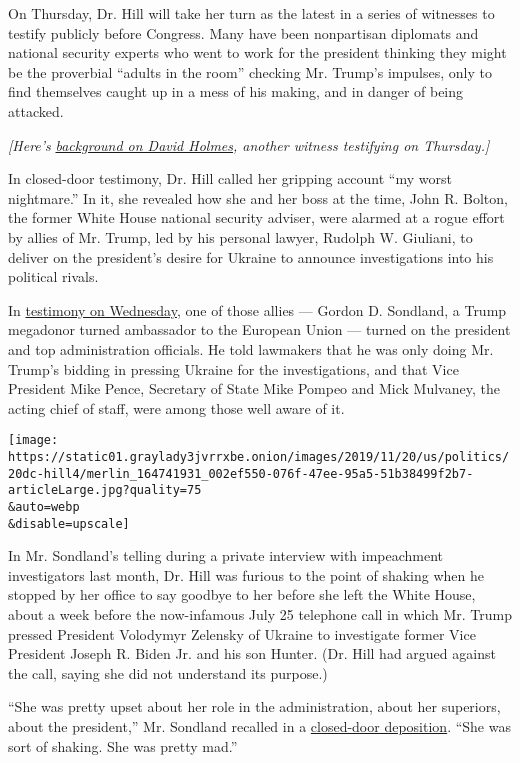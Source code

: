 On Thursday, Dr. Hill will take her turn as the latest in a series of
witnesses to testify publicly before Congress. Many have been
nonpartisan diplomats and national security experts who went to work for
the president thinking they might be the proverbial ``adults in the
room'' checking Mr. Trump's impulses, only to find themselves caught up
in a mess of his making, and in danger of being attacked.

\emph{{[}Here's}
\href{https://www.nytimes3xbfgragh.onion/2019/11/21/us/politics/david-holmes-impeachment.html}{\emph{background
on David Holmes}}\emph{, another witness testifying on Thursday.{]}}

In closed-door testimony, Dr. Hill called her gripping account ``my
worst nightmare.'' In it, she revealed how she and her boss at the time,
John R. Bolton, the former White House national security adviser, were
alarmed at a rogue effort by allies of Mr. Trump, led by his personal
lawyer, Rudolph W. Giuliani, to deliver on the president's desire for
Ukraine to announce investigations into his political rivals.

In
\href{https://www.nytimes3xbfgragh.onion/2019/11/20/us/politics/sondland-defiant-says-he-followed-trumps-orders-to-pressure-ukraine.html}{testimony
on Wednesday}, one of those allies --- Gordon D. Sondland, a Trump
megadonor turned ambassador to the European Union --- turned on the
president and top administration officials. He told lawmakers that he
was only doing Mr. Trump's bidding in pressing Ukraine for the
investigations, and that Vice President Mike Pence, Secretary of State
Mike Pompeo and Mick Mulvaney, the acting chief of staff, were among
those well aware of it.

\texttt{[image: https://static01.graylady3jvrrxbe.onion/images/2019/11/20/us/politics/20dc-hill4/merlin\_164741931\_002ef550-076f-47ee-95a5-51b38499f2b7-articleLarge.jpg?quality=75\\\&auto=webp\\\&disable=upscale]}

In Mr. Sondland's telling during a private interview with impeachment
investigators last month, Dr. Hill was furious to the point of shaking
when he stopped by her office to say goodbye to her before she left the
White House, about a week before the now-infamous July 25 telephone call
in which Mr. Trump pressed President Volodymyr Zelensky of Ukraine to
investigate former Vice President Joseph R. Biden Jr. and his son
Hunter. (Dr. Hill had argued against the call, saying she did not
understand its purpose.)

``She was pretty upset about her role in the administration, about her
superiors, about the president,'' Mr. Sondland recalled in a
\href{https://docs.house.gov/meetings/IG/IG00/CPRT-116-IG00-D006.pdf}{closed-door
deposition}. ``She was sort of shaking. She was pretty mad.''

